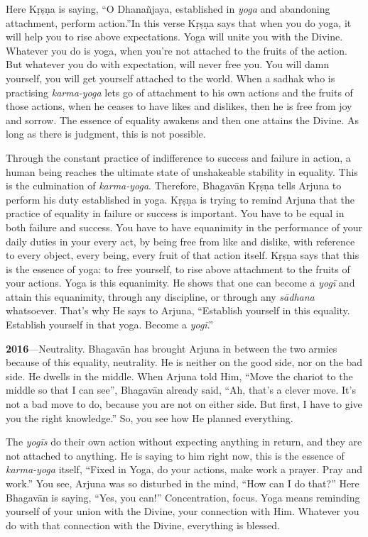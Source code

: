 Here Kṛṣṇa is saying, “O Dhanañjaya, established in \textit{yoga} and abandoning attachment, perform action.”In this verse Kṛṣṇa says that when you do yoga, it will help you to rise above expectations. Yoga will unite you with the Divine. Whatever you do is yoga, when you’re not attached to the fruits of the action. But whatever you do with expectation, will never free you. You will damn yourself, you will get yourself attached to the world. When a sadhak who is practising \textit{karma-yoga} lets go of attachment to his own actions and the fruits of those actions, when he ceases to have likes and dislikes, then he is free from joy and sorrow. The essence of equality awakens and then one attains the Divine. As long as there is judgment, this is not possible.

Through the constant practice of indifference to success and failure in action, a human being reaches the ultimate state of unshakeable stability in equality. This is the culmination of \textit{karma-yoga}. Therefore, Bhagavān Kṛṣṇa tells Arjuna to perform his duty established in yoga. Kṛṣṇa is trying to remind Arjuna that the practice of equality in failure or success is important. You have to be equal in both failure and success. You have to have equanimity in the performance of your daily duties in your every act, by being free from like and dislike, with reference to every object, every being, every fruit of that action itself. Kṛṣṇa says that this is the essence of yoga: to free yourself, to rise above attachment to the fruits of your actions. Yoga is this equanimity. He shows that one can become a \textit{yogī} and attain this equanimity, through any discipline, or through any \textit{sādhana} whatsoever. That’s why He says to Arjuna, “Establish yourself in this equality. Establish yourself in that yoga. Become a \textit{yogī}.”

\textbf{2016}---Neutrality. Bhagavān has brought Arjuna in between the two armies because of this equality, neutrality. He is neither on the good side, nor on the bad side. He dwells in the middle. When Arjuna told Him, “Move the chariot to the middle so that I can see”, Bhagavān already said, “Ah, that’s a clever move. It’s not a bad move to do, because you are not on either side. But first, I have to give you the right knowledge.” So, you see how He planned everything.

The \textit{yogīs} do their own action without expecting anything in return, and they are not attached to anything. He is saying to him right now, this is the essence of \textit{karma-yoga} itself, “Fixed in Yoga, do your actions, make work a prayer. Pray and work.” You see, Arjuna was so disturbed in the mind, “How can I do that?” Here Bhagavān is saying, “Yes, you can!” Concentration, focus. Yoga means reminding yourself of your union with the Divine, your connection with Him. Whatever you do with that connection with the Divine, everything is blessed.

